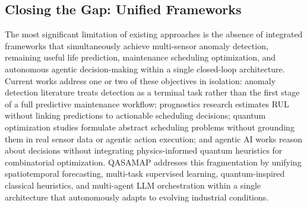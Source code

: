 

\subsection{Closing the Gap: Unified Frameworks}

The most significant limitation of existing approaches is the absence of integrated frameworks that simultaneously achieve multi-sensor anomaly detection, remaining useful life prediction, maintenance scheduling optimization, and autonomous agentic decision-making within a single closed-loop architecture. Current works address one or two of these objectives in isolation: anomaly detection literature \cite{Chalapathy2019, pang_deep_2021} treats detection as a terminal task rather than the first stage of a full predictive maintenance workflow; prognostics research \cite{nizam_real-time_2022} estimates RUL without linking predictions to actionable scheduling decisions; quantum optimization studies \cite{dalyac_qualifying_2021, Blekos2024} formulate abstract scheduling problems without grounding them in real sensor data or agentic action execution; and agentic AI works \cite{erukude_agentic_2025, dwivedi_agentic_2026} reason about decisions without integrating physics-informed quantum heuristics for combinatorial optimization. QASAMAP addresses this fragmentation by unifying spatiotemporal forecasting, multi-task supervised learning, quantum-inspired classical heuristics, and multi-agent LLM orchestration within a single architecture that autonomously adapts to evolving industrial conditions.

